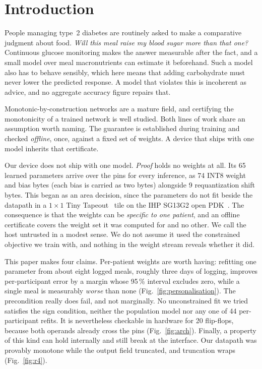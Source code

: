 \documentclass[conference]{IEEEtran}
\begin{document}
\section{Introduction}

People managing type~2 diabetes are routinely asked to make a comparative
judgment about food. \emph{Will this meal raise my blood sugar more than that
one?} Continuous glucose monitoring makes the answer measurable after the fact,
and a small model over meal macronutrients can estimate it beforehand. Such a
model also has to behave sensibly, which here means that adding carbohydrate
must never lower the predicted response. A model that violates this is
incoherent as advice, and no aggregate accuracy figure repairs that.

Monotonic-by-construction networks are a mature field, and certifying the
monotonicity of a trained network is well studied. Both lines of work share an
assumption worth naming. The guarantee is established during training and
checked \emph{offline}, once, against a fixed set of weights. A device that
ships with one model inherits that certificate.

Our device does not ship with one model. \emph{Proof} holds no weights at all.
Its 65 learned parameters arrive over the pins for every inference, as 74 INT8
weight and bias bytes (each bias is carried as two bytes) alongside 9
requantization shift bytes. This began as an area decision, since the
parameters do not fit beside the datapath in a $1\times1$ Tiny
Tapeout~\cite{tinytapeout} tile on the IHP SG13G2 open PDK~\cite{ihp}. The
consequence is that the weights can be \emph{specific to one patient}, and an
offline certificate covers the weight set it was computed for and no other. We
call the host untrusted in a modest sense. We do not assume it used the
constrained objective we train with, and nothing in the weight stream reveals
whether it did.

This paper makes four claims. Per-patient weights are worth having: refitting
one parameter from about eight logged meals, roughly three days of logging,
improves per-participant error by a margin whose 95\,\% interval excludes zero,
while a single meal is measurably \emph{worse} than none
(Fig.~\ref{fig:personalisation}). The precondition really does fail, and not
marginally. No unconstrained fit we tried satisfies the sign condition, neither
the population model nor any one of 44 per-participant refits. It is
nevertheless checkable in hardware for 20 flip-flops, because both operands
already cross the pins (Fig.~\ref{fig:arch}). Finally, a property of this kind
can hold internally and still break at the interface. Our datapath was provably
monotone while the output field truncated, and truncation wraps
(Fig.~\ref{fig:r4}).
\end{document}
